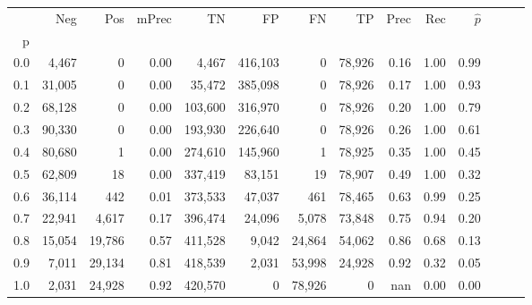 \begin{tabular}{rrrrrrrrrrrrrr}
\toprule
{} &     Neg &     Pos & mPrec &       TN &       FP &      FN &      TP &  Prec &   Rec & $\hat{p}$ \\
p   &         &         &       &          &          &         &         &       &       &           \\
\midrule
0.0 &   4,467 &       0 &  0.00 &    4,467 &  416,103 &       0 &  78,926 &  0.16 &  1.00 &      0.99 \\
0.1 &  31,005 &       0 &  0.00 &   35,472 &  385,098 &       0 &  78,926 &  0.17 &  1.00 &      0.93 \\
0.2 &  68,128 &       0 &  0.00 &  103,600 &  316,970 &       0 &  78,926 &  0.20 &  1.00 &      0.79 \\
0.3 &  90,330 &       0 &  0.00 &  193,930 &  226,640 &       0 &  78,926 &  0.26 &  1.00 &      0.61 \\
0.4 &  80,680 &       1 &  0.00 &  274,610 &  145,960 &       1 &  78,925 &  0.35 &  1.00 &      0.45 \\
0.5 &  62,809 &      18 &  0.00 &  337,419 &   83,151 &      19 &  78,907 &  0.49 &  1.00 &      0.32 \\
0.6 &  36,114 &     442 &  0.01 &  373,533 &   47,037 &     461 &  78,465 &  0.63 &  0.99 &      0.25 \\
0.7 &  22,941 &   4,617 &  0.17 &  396,474 &   24,096 &   5,078 &  73,848 &  0.75 &  0.94 &      0.20 \\
0.8 &  15,054 &  19,786 &  0.57 &  411,528 &    9,042 &  24,864 &  54,062 &  0.86 &  0.68 &      0.13 \\
0.9 &   7,011 &  29,134 &  0.81 &  418,539 &    2,031 &  53,998 &  24,928 &  0.92 &  0.32 &      0.05 \\
1.0 &   2,031 &  24,928 &  0.92 &  420,570 &        0 &  78,926 &       0 &   nan &  0.00 &      0.00 \\
\bottomrule
\end{tabular}
